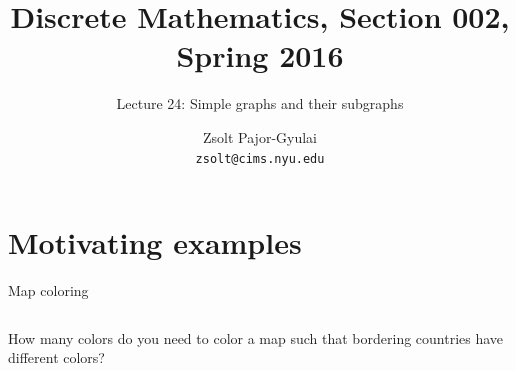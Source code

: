 \documentclass{beamer}
\title{Discrete Mathematics, Section 002, Spring 2016}
\subtitle{Lecture 24: Simple graphs and their subgraphs}
\author[Zsolt]{Zsolt Pajor-Gyulai \\ \texttt{zsolt@cims.nyu.edu}}
\institute[NYU] 
{
\normalsize Courant Institute of Mathematical Sciences
}
\begin{document}
\begin{frame}
  \titlepage
\end{frame}


\section{Motivating examples}

\begin{frame}{Map coloring}
\begin{columns}
How many colors do you need to color a map such that bordering countries have different colors?


\end{columns}
\end{frame}
\end{document}
